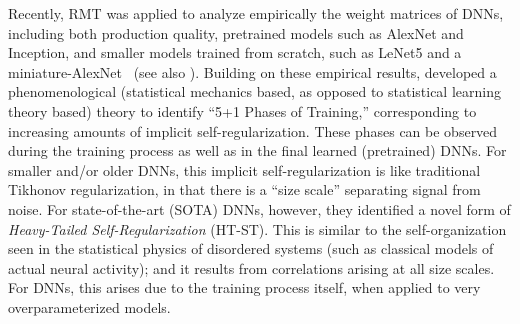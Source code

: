 \documentclass{article}
\begin{document}
Recently, RMT was applied to analyze empirically the weight matrices of DNNs, including both production quality, pretrained models such as AlexNet and Inception, and smaller models trained from scratch, such as LeNet5 and a miniature-AlexNet~\citep{MM18_TR} (see also \citep{MM17_TR, MM18_TR, MM19_HTSR_ICML, MM20_SDM, MM19_KDD}).
Building on these empirical results, 
\citet{MM18_TR} developed a phenomenological (statistical mechanics based, as opposed to statistical learning theory based) theory to identify ``5+1 Phases of Training,'' corresponding to increasing amounts of implicit self-regularization.
These phases can be observed during the training process as well as in the final learned (pretrained) DNNs.
For smaller and/or older DNNs, this implicit self-regularization is like traditional Tikhonov regularization, in that there is a ``size scale'' separating signal from noise.
For state-of-the-art (SOTA) DNNs, however, they identified a novel form of \emph{Heavy-Tailed Self-Regularization} (HT-ST).
This is similar to the self-organization seen in the statistical physics of disordered systems (such as classical models of actual neural activity); and 
it results from correlations arising at all size scales.
For DNNs, this arises due to the training process itself, when applied to very overparameterized models.
\end{document}
